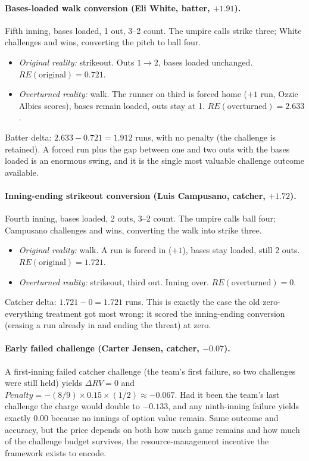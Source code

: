 \paragraph{Bases-loaded walk conversion (Eli White, batter, $+1.91$).}
Fifth inning, bases loaded, 1 out, 3--2 count. The umpire calls strike three;
White challenges and wins, converting the pitch to ball four.
\begin{itemize}
  \item \emph{Original reality:} strikeout. Outs $1 \to 2$, bases loaded
        unchanged. $RE(\text{original}) = 0.721$.
  \item \emph{Overturned reality:} walk. The runner on third is forced home
        ($+1$ run, Ozzie Albies scores), bases remain loaded, outs stay at 1.
        $RE(\text{overturned}) = 2.633$.
\end{itemize}
Batter delta: $2.633 - 0.721 = 1.912$ runs, with no penalty (the challenge is
retained). A forced run plus the gap between one and two outs with the bases
loaded is an enormous swing, and it is the single most valuable challenge
outcome available.

\paragraph{Inning-ending strikeout conversion (Luis Campusano, catcher, $+1.72$).}
Fourth inning, bases loaded, 2 outs, 3--2 count. The umpire calls ball four;
Campusano challenges and wins, converting the walk into strike three.
\begin{itemize}
  \item \emph{Original reality:} walk. A run is forced in ($+1$), bases stay
        loaded, still 2 outs. $RE(\text{original}) = 1.721$.
  \item \emph{Overturned reality:} strikeout, third out. Inning over.
        $RE(\text{overturned}) = 0$.
\end{itemize}
Catcher delta: $1.721 - 0 = 1.721$ runs. This is exactly the case the old
zero-everything treatment got most wrong: it scored the inning-ending
conversion (erasing a run already in and ending the threat) at zero.

\paragraph{Early failed challenge (Carter Jensen, catcher, $-0.07$).}
A first-inning failed catcher challenge (the team's first failure, so two
challenges were still held) yields $\Delta RV = 0$ and
$Penalty = -(8/9) \times 0.15 \times (1/2) \approx -0.067$. Had it been the
team's last challenge the charge would double to $-0.133$, and any ninth-inning
failure yields exactly $0.00$ because no innings of option value remain. Same
outcome and accuracy, but the price depends on both how much game remains and
how much of the challenge budget survives, the resource-management incentive
the framework exists to encode.


